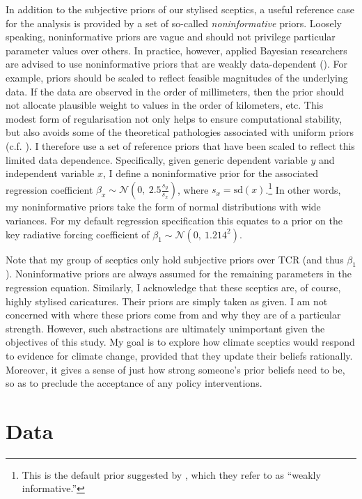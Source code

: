 \documentclass[smallextended]{svjour3}       %
\begin{document}
In addition to the subjective priors of our stylised sceptics, a useful
reference case for the analysis is provided by a set of so-called
\emph{noninformative} priors. Loosely speaking, noninformative priors
are vague and should not privilege particular parameter values over
others. In practice, however, applied Bayesian researchers are advised
to use noninformative priors that are weakly data-dependent
(\cite{gelman2020regression}). For example, priors should be scaled to
reflect feasible magnitudes of the underlying data. If the data are
observed in the order of millimeters, then the prior should not allocate
plausible weight to values in the order of kilometers, etc. This modest
form of regularisation not only helps to ensure computational stability,
but also avoids some of the theoretical pathologies associated with
uniform priors (c.f. \cite{annan2009probabilistic}). I therefore use a
set of reference priors that have been scaled to reflect this limited
data dependence. Specifically, given generic dependent variable \(y\)
and independent variable \(x\), I define a noninformative prior for the
associated regression coefficient
\(\beta_x \sim \mathcal{N}(0, \ 2.5 \frac{s_y}{s_x})\), where
\(s_x = \text{sd}(x)\).\footnote{This is the default prior suggested by
  \cite{rstanarm}, which they refer to as ``weakly informative.''} In
other words, my noninformative priors take the form of normal
distributions with wide variances. For my default regression
specification this equates to a prior on the key radiative forcing
coefficient of \(\beta_1 \sim \mathcal{N}(0, \ 1.214^2)\).

Note that my group of sceptics only hold subjective priors over TCR (and
thus \(\beta_1\)). Noninformative priors are always assumed for the
remaining parameters in the regression equation. Similarly, I
acknowledge that these sceptics are, of course, highly stylised
caricatures. Their priors are simply taken as given. I am not concerned
with where these priors come from and why they are of a particular
strength. However, such abstractions are ultimately unimportant given
the objectives of this study. My goal is to explore how climate sceptics
would respond to evidence for climate change, provided that they update
their beliefs rationally. Moreover, it gives a sense of just how strong
someone's prior beliefs need to be, so as to preclude the acceptance of
any policy interventions.

\hypertarget{sec:data}{%
\section{Data}\label{sec:data}}
\end{document}
